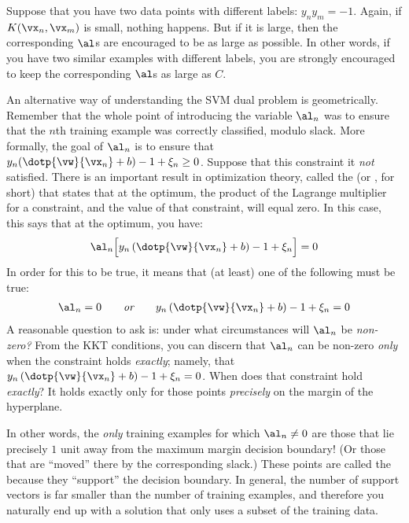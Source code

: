 Suppose that you have two data points with different labels: $y_n y_m
= -1$.  Again, if $K(\vx_n,\vx_m)$ is small, nothing happens.  But if
it is large, then the corresponding $\al$s are encouraged to be as
large as possible.  In other words, if you have two similar examples
with different labels, you are strongly encouraged to keep the
corresponding $\al$s as large as $C$.

An alternative way of understanding the SVM dual problem is
geometrically.  Remember that the whole point of introducing the
variable $\al_n$ was to ensure that the $n$th training example was
correctly classified, modulo slack.  More formally, the goal of
$\al_n$ is to ensure that $y_n (\dotp{\vw}{\vx_n}+b) - 1 + \xi_n \geq 0$.
Suppose that this constraint it \emph{not} satisfied.  There is an
important result in optimization theory, called the
 (or ,
for short) that states that at the optimum, the product of the
Lagrange multiplier for a constraint, and the value of that
constraint, will equal zero.  In this case, this says that at the
optimum, you have:
%
\begin{align}
  \al_n \Big[ y_n \left( \dotp{\vw}{\vx_n} + b \right) - 1 + \xi_n \Big] = 0
\end{align}
%
In order for this to be true, it means that (at least) one of the
following must be true:
%
\begin{align}
  \al_n = 0 \qquad{\textit{or}}\qquad
  y_n \left( \dotp{\vw}{\vx_n} + b \right) - 1 + \xi_n = 0
\end{align}
%
A reasonable question to ask is: under what circumstances will $\al_n$
be \emph{non-zero?}  From the KKT conditions, you can discern that
$\al_n$ can be non-zero \emph{only} when the constraint holds
\emph{exactly}; namely, that $y_n \left( \dotp{\vw}{\vx_n} + b \right)
- 1 + \xi_n = 0$.  When does that constraint hold \emph{exactly}?  It
holds exactly only for those points \emph{precisely} on the margin of
the hyperplane.

In other words, the \emph{only} training examples for which $\al_n
\neq 0$ are those that lie precisely $1$ unit away from the maximum
margin decision boundary!  (Or those that are ``moved'' there by the
corresponding slack.)  These points are called the  because they ``support'' the decision boundary.  In
general, the number of support vectors is far smaller than the number
of training examples, and therefore you naturally end up with a
solution that only uses a subset of the training data.

